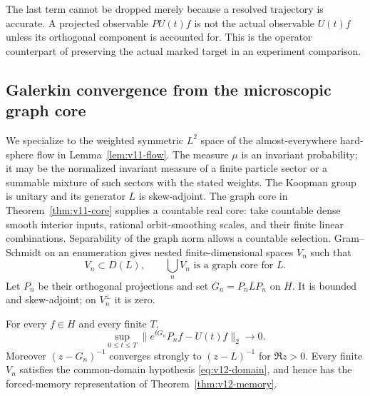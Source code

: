 The last term cannot be dropped merely because a resolved trajectory is
accurate. A projected observable $PU(t)f$ is not the actual observable
$U(t)f$ unless its orthogonal component is accounted for. This is the
operator counterpart of preserving the actual marked target in an
experiment comparison.

\subsection{Galerkin convergence from the microscopic graph core}
We specialize to the weighted symmetric $L^2$ space of the almost-everywhere
hard-sphere flow in Lemma~\ref{lem:v11-flow}. The measure $\mu$ is an
invariant probability; it may be the normalized invariant measure of a
finite particle sector or a summable mixture of such sectors with the
stated weights. The Koopman group is unitary and its generator $L$ is
skew-adjoint. The graph core in Theorem~\ref{thm:v11-core} supplies a
countable real core: take countable dense smooth interior inputs,
rational orbit-smoothing scales, and their finite linear combinations.
Separability of the graph norm allows a countable selection. Gram--Schmidt
on an enumeration gives nested finite-dimensional spaces $V_n$ such that
\[
 V_n\subset D(L),\qquad \bigcup_n V_n\text{ is a graph core for }L.
\]
Let $P_n$ be their orthogonal projections and set $G_n=P_nLP_n$ on $H$.
It is bounded and skew-adjoint; on $V_n^\perp$ it is zero.

\begin{theorem}
\label{thm:v12-galerkin}
For every $f\in H$ and every finite $T$,
\begin{equation}
 \sup_{0\le t\le T}\|e^{tG_n}P_nf-U(t)f\|_2\longrightarrow0.
 \label{eq:v12-galerkin}
\end{equation}
Moreover $(z-G_n)^{-1}$ converges strongly to $(z-L)^{-1}$ for
$\Re z>0$. Every finite $V_n$ satisfies the common-domain hypothesis
\eqref{eq:v12-domain}, and hence has the forced-memory representation
of Theorem~\ref{thm:v12-memory}.
\end{theorem}

